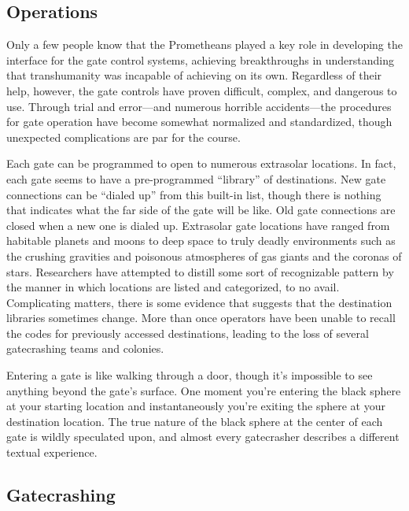\subsection{Operations} 

Only a few people know that the Prometheans played a key role in developing the interface for the gate control systems, achieving breakthroughs in understanding that transhumanity was incapable of achieving on its own. Regardless of their help, however, the gate controls have proven difficult, complex, and dangerous to use. Through trial and error—and numerous horrible accidents—the procedures for gate operation have become somewhat normalized and standardized, though unexpected complications are par for the course. 

Each gate can be programmed to open to numerous extrasolar locations. In fact, each gate seems to have a pre-programmed ``library'' of destinations. New gate connections can be ``dialed up'' from this built-in list, though there is nothing that indicates what the far side of the gate will be like. Old gate connections are closed when a new one is dialed up. Extrasolar gate locations have ranged from habitable planets and moons to deep space to truly deadly environments such as the crushing gravities and poisonous atmospheres of gas giants and the coronas of stars. Researchers have attempted to distill some sort of recognizable pattern by the manner in which locations are listed and categorized, to no avail. Complicating matters, there is some evidence that suggests that the destination libraries sometimes change. More than once operators have been unable to recall the codes for previously accessed destinations, leading to the loss of several gatecrashing teams and colonies. 

Entering a gate is like walking through a door, though it's impossible to see anything beyond the gate's surface. One moment you're entering the black sphere at your starting location and instantaneously you're exiting the sphere at your destination location. The true nature of the black sphere at the center of each gate is wildly speculated upon, and almost every gatecrasher describes a different textual experience. 

\subsection{Gatecrashing} 

